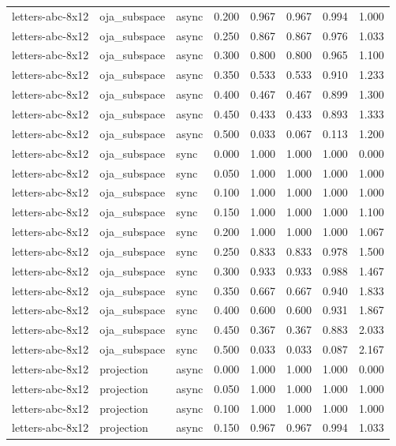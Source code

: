 \begin{tabular}{lllrrrrr}
letters-abc-8x12 & oja\_subspace & async & 0.200 & 0.967 & 0.967 & 0.994 & 1.000 \\
letters-abc-8x12 & oja\_subspace & async & 0.250 & 0.867 & 0.867 & 0.976 & 1.033 \\
letters-abc-8x12 & oja\_subspace & async & 0.300 & 0.800 & 0.800 & 0.965 & 1.100 \\
letters-abc-8x12 & oja\_subspace & async & 0.350 & 0.533 & 0.533 & 0.910 & 1.233 \\
letters-abc-8x12 & oja\_subspace & async & 0.400 & 0.467 & 0.467 & 0.899 & 1.300 \\
letters-abc-8x12 & oja\_subspace & async & 0.450 & 0.433 & 0.433 & 0.893 & 1.333 \\
letters-abc-8x12 & oja\_subspace & async & 0.500 & 0.033 & 0.067 & 0.113 & 1.200 \\
letters-abc-8x12 & oja\_subspace & sync & 0.000 & 1.000 & 1.000 & 1.000 & 0.000 \\
letters-abc-8x12 & oja\_subspace & sync & 0.050 & 1.000 & 1.000 & 1.000 & 1.000 \\
letters-abc-8x12 & oja\_subspace & sync & 0.100 & 1.000 & 1.000 & 1.000 & 1.000 \\
letters-abc-8x12 & oja\_subspace & sync & 0.150 & 1.000 & 1.000 & 1.000 & 1.100 \\
letters-abc-8x12 & oja\_subspace & sync & 0.200 & 1.000 & 1.000 & 1.000 & 1.067 \\
letters-abc-8x12 & oja\_subspace & sync & 0.250 & 0.833 & 0.833 & 0.978 & 1.500 \\
letters-abc-8x12 & oja\_subspace & sync & 0.300 & 0.933 & 0.933 & 0.988 & 1.467 \\
letters-abc-8x12 & oja\_subspace & sync & 0.350 & 0.667 & 0.667 & 0.940 & 1.833 \\
letters-abc-8x12 & oja\_subspace & sync & 0.400 & 0.600 & 0.600 & 0.931 & 1.867 \\
letters-abc-8x12 & oja\_subspace & sync & 0.450 & 0.367 & 0.367 & 0.883 & 2.033 \\
letters-abc-8x12 & oja\_subspace & sync & 0.500 & 0.033 & 0.033 & 0.087 & 2.167 \\
letters-abc-8x12 & projection & async & 0.000 & 1.000 & 1.000 & 1.000 & 0.000 \\
letters-abc-8x12 & projection & async & 0.050 & 1.000 & 1.000 & 1.000 & 1.000 \\
letters-abc-8x12 & projection & async & 0.100 & 1.000 & 1.000 & 1.000 & 1.000 \\
letters-abc-8x12 & projection & async & 0.150 & 0.967 & 0.967 & 0.994 & 1.033 \\

\end{tabular}
